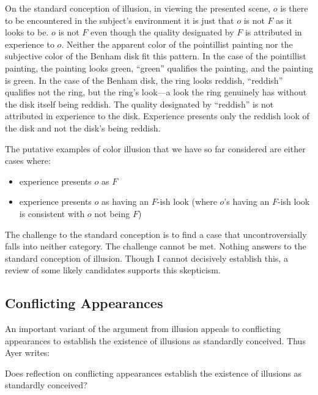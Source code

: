 \documentclass[12pt]{article}
\begin{document}
On the standard conception of illusion, in viewing the presented scene, \( o \) is there to be encountered in the subject's environment it is just that \( o \) is not \( F \) as it looks to be. \( o \) is not \( F \) even though the quality designated by \( F \) is attributed in experience to \( o \).  Neither the apparent color of the pointillist painting nor the subjective color of the Benham disk fit this pattern. In the case of the pointillist painting, the painting looks green, ``green'' qualifies the painting, and the painting is green. In the case of the Benham disk, the ring looks reddish, ``reddish'' qualifies not the ring, but the ring's look---a look the ring genuinely has without the disk itself being reddish. The quality designated by ``reddish'' is not attributed in experience to the disk. Experience presents only the reddish look of the disk and not the disk's being reddish.

The putative examples of color illusion that we have so far considered are either cases where:
\begin{itemize}
	\item experience presents \( o \) as \( F \)
	\item experience presents \( o \) as having an \( F \)-ish look (where \( o \)'s having an \( F \)-ish look is consistent with \( o \) not being \( F \))
\end{itemize}
The challenge to the standard conception is to find a case that uncontroversially falls into neither category. The challenge cannot be met. Nothing answers to the standard conception of illusion. Though I cannot decisively establish this, a review of some likely candidates supports this skepticism.

\subsection{Conflicting Appearances}\label{sub:conflicting_appearances} %

An important variant of the argument from illusion appeals to conflicting appearances to establish the existence of illusions as standardly conceived. Thus Ayer writes:
\begin{quote}
\end{quote}
Does reflection on conflicting appearances establish the existence of illusions as standardly conceived?
\end{document}
